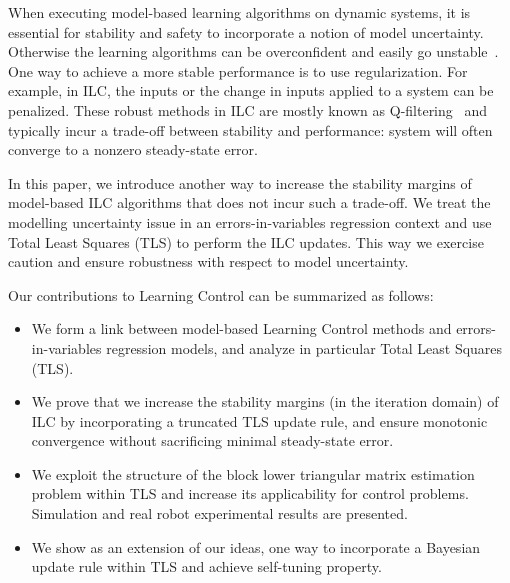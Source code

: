 \documentclass[10pt,a4paper]{article}
\begin{document}
When executing model-based learning algorithms on dynamic systems, it is essential for stability and safety to incorporate a notion of model uncertainty. Otherwise the learning algorithms can be overconfident and easily go unstable~\cite{Longman2000}. One way to achieve a more stable performance is to use regularization. For example, in ILC, the inputs or the change in inputs applied to a system can be penalized. These robust methods in ILC are mostly known as Q-filtering~\cite{Bristow06} and typically incur a trade-off between stability and performance: system will often converge to a nonzero steady-state error. %

In this paper, we introduce another way to increase the stability margins of model-based ILC algorithms that does not incur such a trade-off. We treat the modelling uncertainty issue in an errors-in-variables regression context and use Total Least Squares (TLS) to perform the ILC updates. This way we exercise caution and ensure robustness with respect to model uncertainty. %

Our contributions to Learning Control can be summarized as follows:

\begin{itemize}
\item We form a link between model-based Learning Control methods and errors-in-variables regression models, and analyze in particular Total Least Squares (TLS).
\item We prove that we increase the stability margins (in the iteration domain) of ILC by incorporating a truncated TLS update rule, and ensure monotonic convergence without sacrificing minimal steady-state error. 
\item We exploit the structure of the block lower triangular matrix estimation problem within TLS and increase its applicability for control problems. Simulation and real robot experimental results are presented.
\item We show as an extension of our ideas, one way to incorporate a Bayesian update rule within TLS and achieve self-tuning property. 
\end{itemize}
\end{document}
